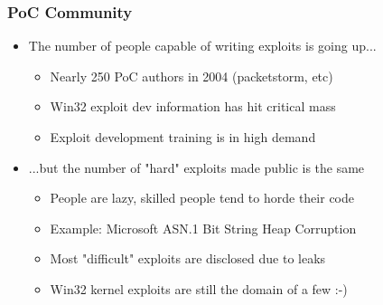 \documentclass{beamer}
\newenvironment{sitemize}{\vspace{1mm}\begin{itemize}\itemsep 4pt\small}{\end{itemize}}
\begin{document}
\begin{frame}[t]
  \frametitle{PoC Community}
	
	\begin{sitemize}
		\item The number of people capable of writing exploits is going up...
		\begin{sitemize}
			\item Nearly 250 PoC authors in 2004 (packetstorm, etc)
			\item Win32 exploit dev information has hit critical mass
			\item Exploit development training is in high demand
		\end{sitemize}	
	\end{sitemize}
	
	\pause
	\begin{sitemize}
		\item ...but the number of "hard" exploits made public is the same
		\begin{sitemize}
			\item People are lazy, skilled people tend to horde their code
			\item Example: Microsoft ASN.1 Bit String Heap Corruption
			\item Most "difficult" exploits are disclosed due to leaks
			\item Win32 kernel exploits are still the domain of a few :-)
		\end{sitemize}
	\end{sitemize}
\end{frame}
\end{document}

